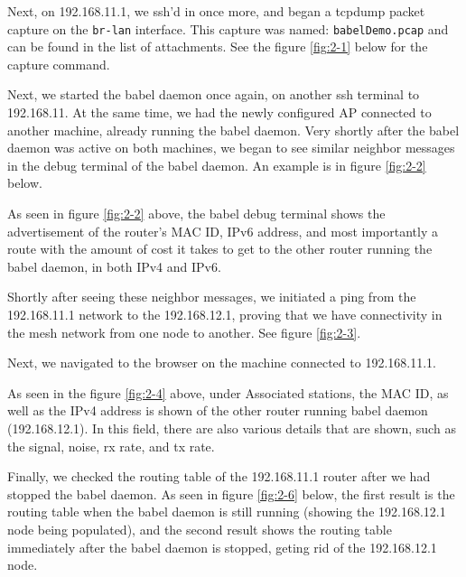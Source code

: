 \documentclass[main.tex]{subfiles}
\begin{document}
Next, on 192.168.11.1, we ssh'd in once more, and began a tcpdump packet capture on the \texttt{br-lan} interface. This capture was named: \texttt{babelDemo.pcap} and can be found in the list of attachments. See the figure \ref{fig:2-1} below for the capture command.


Next, we started the babel daemon once again, on another ssh terminal to 192.168.11. At the same time, we had the newly configured AP connected to another machine, already running the babel daemon. Very shortly after the babel daemon was active on both machines, we began to see similar neighbor messages in the debug terminal of the babel daemon. An example is in figure \ref{fig:2-2} below.


As seen in figure \ref{fig:2-2} above, the babel debug terminal shows the advertisement of the router's MAC ID, IPv6 address, and most importantly a route with the amount of cost it takes to get to the other router running the babel daemon, in both IPv4 and IPv6. 

Shortly after seeing these neighbor messages, we initiated a ping from the 192.168.11.1 network to the 192.168.12.1, proving that we have connectivity in the mesh network from one node to another. See figure \ref{fig:2-3}.


Next, we navigated to the browser on the machine connected to 192.168.11.1.


As seen in the figure \ref{fig:2-4} above, under Associated stations, the MAC ID, as well as the IPv4 address is shown of the other router running babel daemon (192.168.12.1). In this field, there are also various details that are shown, such as the signal, noise, rx rate, and tx rate. 

Finally, we checked the routing table of the 192.168.11.1 router after we had stopped the babel daemon. As seen in figure \ref{fig:2-6} below, the first result is the routing table when the babel daemon is still running (showing the 192.168.12.1 node being populated), and the second result shows the routing table immediately after the babel daemon is stopped, geting rid of the 192.168.12.1 node. 
\end{document}
